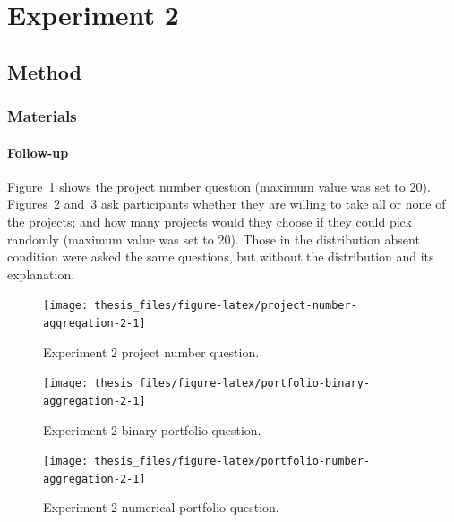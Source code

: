 \documentclass[a4paper, nobind, dvipsnames]{templates/ociamthesis}
\theoremstyle{definition}
\theoremstyle{definition}
\theoremstyle{definition}
\theoremstyle{definition}
\theoremstyle{remark}
\begin{document}
\section{Experiment 2}

\subsection{Method}

\subsubsection{Materials}

\hypertarget{follow-up-materials-aggregation-2-appendix}{%
\paragraph{Follow-up}\label{follow-up-materials-aggregation-2-appendix}}

Figure~\ref{fig:project-number-aggregation-2} shows the project number
question (maximum value was set to 20).
Figures~\ref{fig:portfolio-binary-aggregation-2}
and~\ref{fig:portfolio-number-aggregation-2} ask participants whether they are
willing to take all or none of the projects; and how many projects would they
choose if they could pick randomly (maximum value was set to 20). Those in the
distribution absent condition were asked the same questions, but without the
distribution and its explanation.



\begin{figure}
\texttt{[image: thesis\_files/figure-latex/project-number-aggregation-2-1]} \caption{Experiment 2 project number question.}\label{fig:project-number-aggregation-2}
\end{figure}



\begin{figure}
\texttt{[image: thesis\_files/figure-latex/portfolio-binary-aggregation-2-1]} \caption{Experiment 2 binary portfolio question.}\label{fig:portfolio-binary-aggregation-2}
\end{figure}



\begin{figure}
\texttt{[image: thesis\_files/figure-latex/portfolio-number-aggregation-2-1]} \caption{Experiment 2 numerical portfolio question.}\label{fig:portfolio-number-aggregation-2}
\end{figure}
\end{document}
